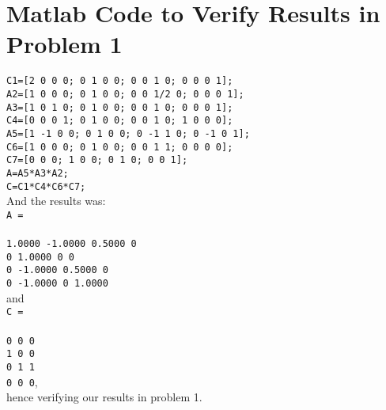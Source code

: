 \documentclass[11pt]{article}
\begin{document}
\section{Matlab Code to Verify Results in Problem 1}
\texttt
{C1=[2 0 0 0; 0 1 0 0; 0 0 1 0; 0 0 0 1];\\
A2=[1 0 0 0; 0 1 0 0; 0 0 1/2 0; 0 0 0 1];\\
A3=[1 0 1 0; 0 1 0 0; 0 0 1 0; 0 0 0 1];\\
C4=[0 0 0 1; 0 1 0 0; 0 0 1 0; 1 0 0 0];\\
A5=[1 -1 0 0; 0 1 0 0; 0 -1 1 0; 0 -1 0 1];\\
C6=[1 0 0 0; 0 1 0 0; 0 0 1 1; 0 0 0 0];\\
C7=[0 0 0; 1 0 0; 0 1 0; 0 0 1];\\
A=A5*A3*A2;\\
C=C1*C4*C6*C7;\\}
And the results was:\\ 
\texttt
{A =\\
\\    1.0000   -1.0000    0.5000         0\\
         0    1.0000         0         0\\
         0   -1.0000    0.5000         0\\
         0   -1.0000         0    1.0000\\}
and \\
\texttt
{C =\\
\\  
     0     0     0\\
     1     0     0\\
     0     1     1\\
     0     0     0}, \\
hence verifying our results in problem 1.
\newpage
\end{document}
